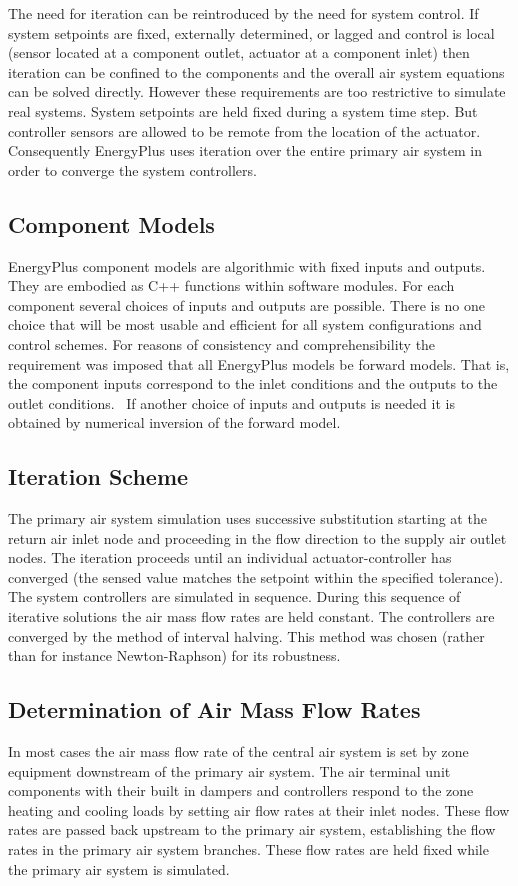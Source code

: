 The need for iteration can be reintroduced by the need for system control. If system setpoints are fixed, externally determined, or lagged and control is local (sensor located at a component outlet, actuator at a component inlet) then iteration can be confined to the components and the overall air system equations can be solved directly. However these requirements are too restrictive to simulate real systems. System setpoints are held fixed during a system time step. But controller sensors are allowed to be remote from the location of the actuator. Consequently EnergyPlus uses iteration over the entire primary air system in order to converge the system controllers.

\subsection{Component Models}\label{component-models}

EnergyPlus component models are algorithmic with fixed inputs and outputs. They are embodied as C++ functions within software modules. For each component several choices of inputs and outputs are possible. There is no one choice that will be most usable and efficient for all system configurations and control schemes. For reasons of consistency and comprehensibility the requirement was imposed that all EnergyPlus models be forward models. That is, the component inputs correspond to the inlet conditions and the outputs to the outlet conditions.~ If another choice of inputs and outputs is needed it is obtained by numerical inversion of the forward model.

\subsection{Iteration Scheme}\label{iteration-scheme}

The primary air system simulation uses successive substitution starting at the return air inlet node and proceeding in the flow direction to the supply air outlet nodes. The iteration proceeds until an individual actuator-controller has converged (the sensed value matches the setpoint within the specified tolerance). The system controllers are simulated in sequence. During this sequence of iterative solutions the air mass flow rates are held constant. The controllers are converged by the method of interval halving. This method was chosen (rather than for instance Newton-Raphson) for its robustness.

\subsection{Determination of Air Mass Flow Rates}\label{determination-of-air-mass-flow-rates}

In most cases the air mass flow rate of the central air system is set by zone equipment downstream of the primary air system. The air terminal unit components with their built in dampers and controllers respond to the zone heating and cooling loads by setting air flow rates at their inlet nodes. These flow rates are passed back upstream to the primary air system, establishing the flow rates in the primary air system branches. These flow rates are held fixed while the primary air system is simulated.
